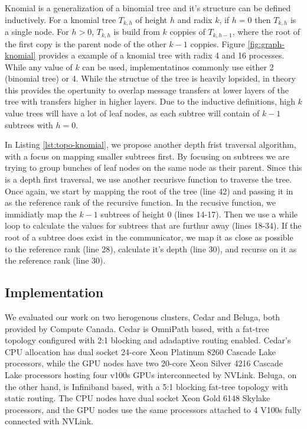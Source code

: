 
\lstset{label = lst:topo-knomial}
\lstset{caption = Heuristic for rank reordering knomial trees.}


Knomial is a generalization of a binomial tree and it's structure can be defined inductively.
For a knomial tree $T_{k,h}$ of height $h$ and radix $k$, if $h=0$ then $T_{k,h}$ is a single node. For $h>0$, $T_{k,h}$ is build from $k$ coppies of $T_{k,h-1}$, where the root of the first copy is the parent node of the other $k-1$ coppies.
Figure \ref{fig:graph-knomial} provides a example of a knomial tree with radix 4 and 16 processes.
While any value of $k$ can be used, implementatinos commonly use either 2 (binomial tree) or 4. 
While the structue of the tree is heavily lopsided, in theory this provides the opertunity to overlap message transfers at lower layers of the tree with transfers higher in higher layers.
Due to the inductive definitions, high $k$ value trees will have a lot of leaf nodes, as each subtree will contain of $k-1$ subtrees with $h=0$.

In Listing \ref{lst:topo-knomial}, we propose another depth frist traversal algorithm, with a focus on mapping smaller subtrees first.
By focusing on subtrees we are trying to group bunches of leaf nodes on the same node as their parent.
Since this is a depth first traversal, we use another recurisve function to traverse the tree. 
Once again, we start by mapping the root of the tree (line 42) and passing it in as the reference rank of the recursive function.
In the recusive function, we immidiatly map the $k-1$ subtrees of height 0 (lines 14-17).
Then we use a while loop to calculate the values for subtrees that are furthur away (lines 18-34).
If the root of a subtree does exist in the communicator, we map it as close as possible to the reference rank (line 28), calculate it's depth (line 30), and recurse on it as the reference rank (line 30).


\subsection{Implementation}

We evaluated our work on two herogenous clusters, Cedar and Beluga, both provided by Compute Canada. 
Cedar is OmniPath based, with a fat-tree topology configured with 2:1 blocking and adadaptive routing enabled.
Cedar's CPU allocation has dual socket 24-core Xeon Platinum 8260 Cascade Lake processors, while the GPU nodes have two 20-core Xeon Silver 4216 Cascade Lake processors hosting four v100s GPUs interconnected by NVLink.
Beluga, on the other hand, is Infiniband based, with a 5:1 blocking fat-tree topology with static routing.  
The CPU nodes have dual socket Xeon Gold 6148 Skylake processors, and the GPU nodes use the same processors attached to 4 V100s fully connected with NVLink.

